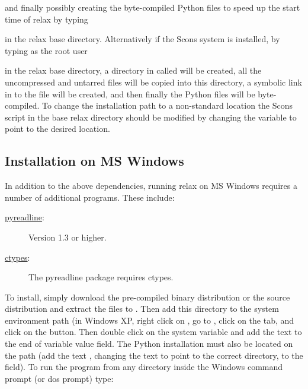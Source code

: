 
and finally possibly creating the byte-compiled Python  files to speed up the start time of relax by typing


in the relax base directory.  Alternatively if the Scons system is installed, by typing as the root user


in the relax base directory, a directory in  called  will be created, all the uncompressed and untarred files will be copied into this directory, a symbolic link in  to the file  will be created, and then finally the Python  files will be byte-compiled.  To change the installation path to a non-standard location the Scons script  in the base relax directory should be modified by changing the variable  to point to the desired location.



\subsection{Installation on MS Windows}

In addition to the above dependencies, running relax on MS Windows requires a number of additional programs.  These include:

\begin{description}
\item[\href{http://projects.scipy.org/ipython/ipython/wiki/PyReadline/Intro}{pyreadline}:]  Version 1.3 or higher.
\item[\href{http://starship.python.net/crew/theller/ctypes/}{ctypes}:]  The pyreadline package requires ctypes.
\end{description}

To install, simply download the pre-compiled binary distribution  or the source distribution  and extract the files to .  Then add this directory to the system environment path (in Windows XP, right click on , go to , click on the  tab, and click on the  button.  Then double click on the  system variable and add the text  to the end of variable value field.  The Python installation must also be located on the path (add the text , changing the text to point to the correct directory, to the field).  To run the program from any directory inside the Windows command prompt (or dos prompt) type:

